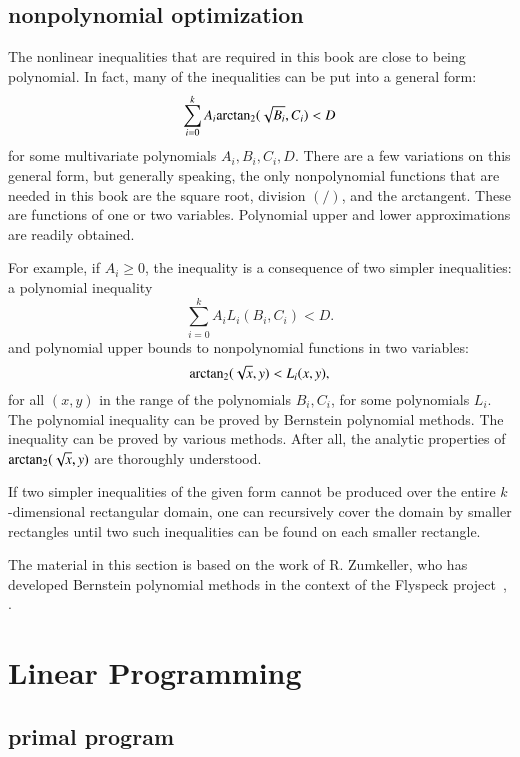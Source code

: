 \subsection{nonpolynomial optimization}

The nonlinear inequalities that are required in this book are close to
being polynomial.  In fact, many  of the inequalities can be put into a
general form:
\begin{equation}\label{eqn:ABCD}
\sum_{i=0}^k A_i {\operatorname{arctan_2}}(\sqrt{B_i},C_i) < D
\end{equation}
for some multivariate polynomials $A_i,B_i,C_i,D$.  There are a few
variations on this general form, but generally speaking, the only
nonpolynomial functions that are needed in this book are the square
root, division $(/)$, and the arctangent.  These
are functions of one or two variables.  Polynomial upper and lower
approximations are readily obtained.

For example, if $A_i\ge 0$, the inequality  is a
consequence of two simpler inequalities: a polynomial inequality
\[
\sum_{i=0}^k A_i L_i(B_i,C_i) < D.
\]
and polynomial upper bounds to nonpolynomial functions in two variables:
\begin{equation}\label{eqn:sL}
{\operatorname{arctan\ensuremath{_2}}}(\sqrt{x},y) < L_i(x,y),
\end{equation}
for all $(x,y)$ in the range of the polynomials $B_i,C_i$, for some
polynomials $L_i$.  The polynomial
inequality can be proved by Bernstein polynomial methods.  The
inequality  can be proved by various methods.  After all,
the analytic properties of ${\operatorname{arctan_2}}(\sqrt{x},y)$ are thoroughly
understood.

If two simpler inequalities of the given form cannot be produced over
the entire $k$-dimensional rectangular domain, one can recursively
cover the domain by smaller rectangles until two such inequalities can
be found on each smaller rectangle.

The material in this section is based on the work of R. Zumkeller, who
has developed Bernstein polynomial methods in the context of the
Flyspeck project~\cite{roland-thesis}, \cite{zumkeller-nonlinear}.


\section{Linear Programming}\label{sec:lp}

\subsection{primal program}

